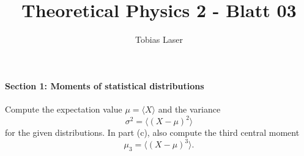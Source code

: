 \documentclass[11pt,a4paper]{scrartcl}
\begin{document}
\title{Theoretical Physics 2 - Blatt 03}
\author{Tobias Laser}
\date{}
\maketitle
\vfill
\thispagestyle{empty}


\paragraph{Section 1: Moments of statistical distributions}

Compute the expectation value $\mu=\langle X\rangle$ and the variance
\[
\sigma^2=\langle (X-\mu)^2\rangle
\]
for the given distributions. In part (c), also compute the third central moment
\[
\mu_3=\langle (X-\mu)^3\rangle.
\]
\end{document}
